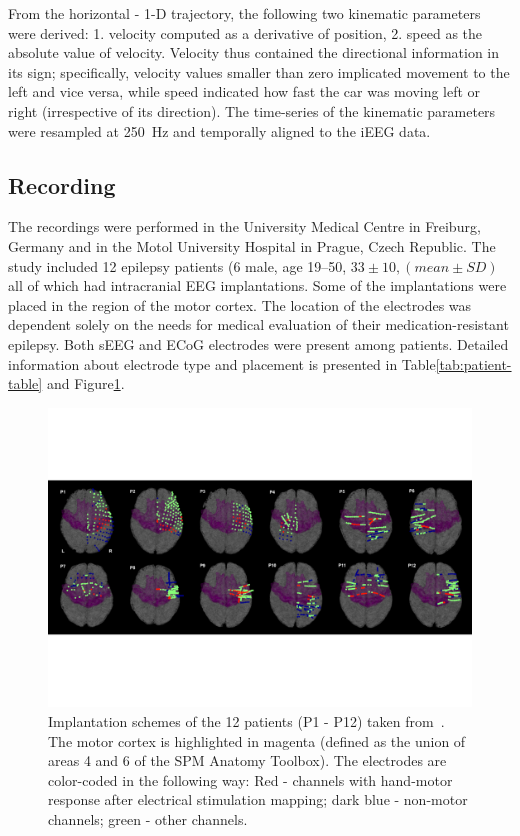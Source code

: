 From the horizontal - 1-D trajectory, the following two kinematic parameters were derived:
1. velocity computed as a derivative of position, 2. speed as the absolute value of velocity.
Velocity thus contained the directional information in its sign;
specifically, velocity values smaller than zero implicated movement to the left and vice versa, while speed indicated how fast the car was moving left or right (irrespective of its direction).
The time-series of the kinematic parameters were resampled at 250~Hz and temporally aligned to the iEEG data.

\subsection{Recording}\label{subsec:recording}
The recordings were performed in the University Medical Centre in Freiburg, Germany and in the Motol University Hospital in Prague, Czech Republic.
The study included 12 epilepsy patients (6 male, age 19--50, $ 33 \pm 10, (mean \pm SD )$ all of which had intracranial EEG implantations.
Some of the implantations were placed in the region of the motor cortex.
The location of the electrodes was dependent solely on the needs for medical evaluation of their medication-resistant epilepsy.
Both sEEG and ECoG electrodes were present among patients.
Detailed information about electrode type and placement is presented in Table\ref{tab:patient-table} and Figure\ref{fig:electrodes}.

\begin{figure}[!htbp]
\centering
\includegraphics[width=0.8\linewidth]{img/ch3/electrodes}
\caption[Implantation schemes]{Implantation schemes of the 12 patients (P1 - P12) taken from~\cite{Hammer-2021}. The motor cortex is highlighted in magenta (defined as the union of areas 4 and 6 of the SPM Anatomy Toolbox). The electrodes are color-coded in the following way: Red - channels with hand-motor response after electrical stimulation mapping; dark blue - non-motor channels; green - other channels.}
\label{fig:electrodes}
\end{figure}

